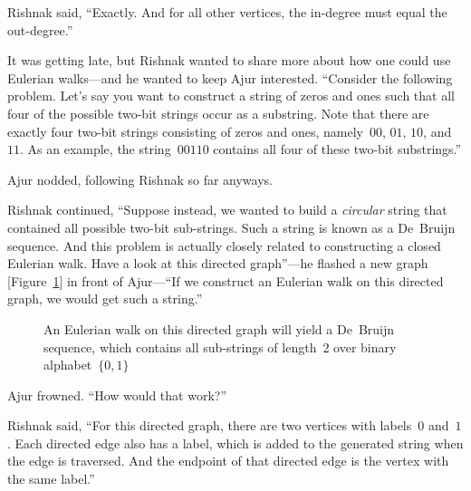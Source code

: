 Rishnak said, ``Exactly. And for all other vertices, the in-degree must equal the out-degree.''

It was getting late, but Rishnak wanted to share more about how one could use Eulerian walks---and he wanted to keep Ajur interested. ``Consider the following problem. Let's say you want to construct a string of zeros and ones such that all four of the possible two-bit strings occur as a substring. Note that there are exactly four two-bit strings consisting of zeros and ones, namely~$00$, $01$, $10$, and~$11$. As an example, the string~$00110$ contains all four of these two-bit substrings.''

Ajur nodded, following Rishnak so far anyways.

Rishnak continued, ``Suppose instead, we wanted to build a \textit{circular} string that contained all possible two-bit sub-strings. Such a string is known as a De~Bruijn sequence.  And this problem is actually closely related to constructing a closed Eulerian walk. Have a look at this directed graph''---he flashed a new graph [Figure~\ref{4g55}] in front of Ajur---``If we construct an Eulerian walk on this directed graph, we would get such a string.''

\begin{figure}
\begin{center}
\caption{An Eulerian walk on this directed graph will yield a De~Bruijn sequence, which contains all sub-strings of length~2 over binary alphabet~$\{0,1\}$}\label{4g55}
\end{center}
\end{figure}

Ajur frowned. ``How would that work?''

Rishnak said, ``For this directed graph, there are two vertices with labels~$0$ and~$1$. Each directed edge also has a label, which is added to the generated string when the edge is traversed. And the endpoint of that directed edge is the vertex with the same label.''

